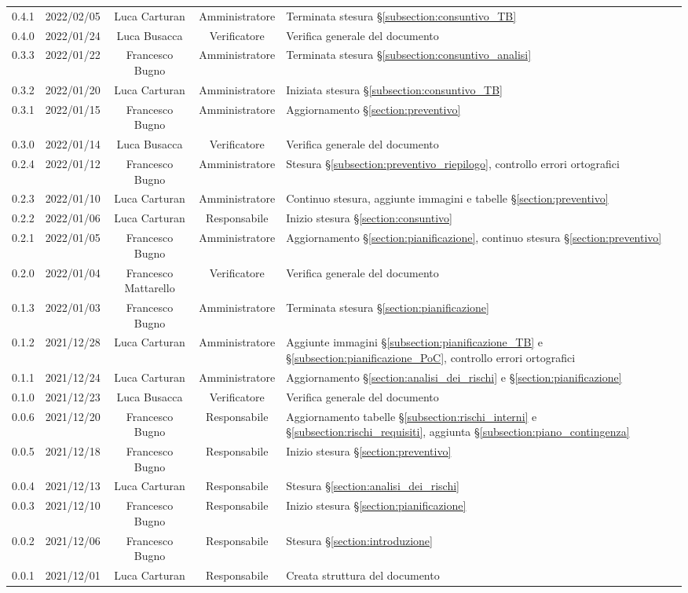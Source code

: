 \begin{center}
\begin{longtable}[c]{c | c | c | c | p{5cm}}
		0.4.1 & 2022/02/05 & Luca Carturan & Amministratore & Terminata stesura §\ref{subsection:consuntivo_TB} \\
		0.4.0 & 2022/01/24 & Luca Busacca & Verificatore & Verifica generale del documento\\
		0.3.3 & 2022/01/22 & Francesco Bugno & Amministratore & Terminata stesura §\ref{subsection:consuntivo_analisi} \\
		0.3.2 & 2022/01/20 & Luca Carturan & Amministratore & Iniziata stesura §\ref{subsection:consuntivo_TB} \\
		0.3.1 & 2022/01/15 & Francesco Bugno & Amministratore & Aggiornamento §\ref{section:preventivo} \\
		0.3.0 & 2022/01/14 & Luca Busacca & Verificatore & Verifica generale del documento \\
		0.2.4 & 2022/01/12 & Francesco Bugno & Amministratore & Stesura §\ref{subsection:preventivo_riepilogo}, controllo errori ortografici \\
		0.2.3 & 2022/01/10 & Luca Carturan & Amministratore & Continuo stesura, aggiunte immagini e tabelle §\ref{section:preventivo} \\
		0.2.2 & 2022/01/06 & Luca Carturan & Responsabile & Inizio stesura §\ref{section:consuntivo}\\
		0.2.1 & 2022/01/05 & Francesco Bugno & Amministratore & Aggiornamento §\ref{section:pianificazione}, continuo stesura §\ref{section:preventivo} \\
		0.2.0 & 2022/01/04 & Francesco Mattarello & Verificatore   & Verifica generale del documento \\
		0.1.3 & 2022/01/03 & Francesco Bugno & Amministratore & Terminata stesura §\ref{section:pianificazione} \\
		0.1.2 & 2021/12/28 & Luca Carturan & Amministratore & Aggiunte immagini §\ref{subsection:pianificazione_TB} e §\ref{subsection:pianificazione_PoC}, controllo errori ortografici \\
		0.1.1 & 2021/12/24 & Luca Carturan & Amministratore & Aggiornamento §\ref{section:analisi_dei_rischi} e §\ref{section:pianificazione}\\
		0.1.0 & 2021/12/23 & Luca Busacca & Verificatore   & Verifica generale del documento \\
		0.0.6 & 2021/12/20 & Francesco Bugno & Responsabile   & Aggiornamento tabelle §\ref{subsection:rischi_interni} e §\ref{subsection:rischi_requisiti}, aggiunta §\ref{subsection:piano_contingenza} \\
		0.0.5 & 2021/12/18 & Francesco Bugno & Responsabile & Inizio stesura §\ref{section:preventivo}\\
		0.0.4 & 2021/12/13 & Luca Carturan & Responsabile   & Stesura §\ref{section:analisi_dei_rischi} \\
		0.0.3 & 2021/12/10 & Francesco Bugno & Responsabile & Inizio stesura §\ref{section:pianificazione} \\
		0.0.2 & 2021/12/06 & Francesco Bugno & Responsabile   & Stesura §\ref{section:introduzione} \\
		0.0.1 & 2021/12/01 & Luca Carturan & Responsabile   & Creata struttura del documento
	\end{longtable}
\end{center}